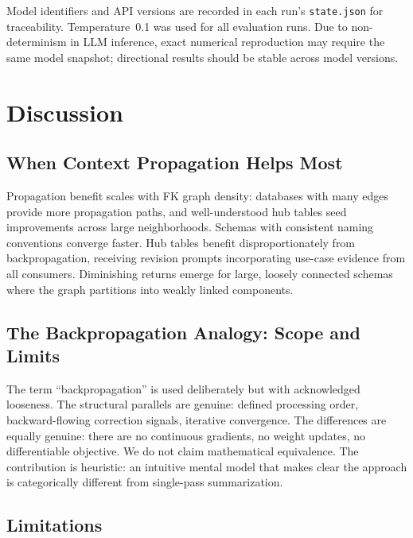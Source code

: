\documentclass[twocolumn]{svjour3}
\begin{document}
Model identifiers and API versions are recorded in each run's \texttt{state.json} for traceability. Temperature~0.1 was used for all evaluation runs. Due to non-determinism in LLM inference, exact numerical reproduction may require the same model snapshot; directional results should be stable across model versions.


\section{Discussion}\label{sec:discussion}

\subsection{When Context Propagation Helps Most}

Propagation benefit scales with FK graph density: databases with many edges provide more propagation paths, and well-understood hub tables seed improvements across large neighborhoods. Schemas with consistent naming conventions converge faster. Hub tables benefit disproportionately from backpropagation, receiving revision prompts incorporating use-case evidence from all consumers. Diminishing returns emerge for large, loosely connected schemas where the graph partitions into weakly linked components.

\subsection{The Backpropagation Analogy: Scope and Limits}\label{sec:backprop-limits}

The term ``backpropagation'' is used deliberately but with acknowledged looseness. The structural parallels are genuine: defined processing order, backward-flowing correction signals, iterative convergence. The differences are equally genuine: there are no continuous gradients, no weight updates, no differentiable objective. We do not claim mathematical equivalence. The contribution is heuristic: an intuitive mental model that makes clear the approach is categorically different from single-pass summarization.

\subsection{Limitations}
\end{document}
